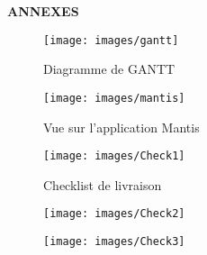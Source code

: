 \newpage
\textbf{ANNEXES}
\newpage

\begin{figure}[!h]
\begin{center}
\texttt{[image: images/gantt]}
\end{center}
\caption{Diagramme de GANTT}
\end{figure}

\begin{figure}[!h]
\begin{center}
\texttt{[image: images/mantis]}
\end{center}
\caption{Vue sur l'application Mantis}
\end{figure}

\begin{figure}[!h]
\begin{center}
\caption{Checklist de livraison}
\texttt{[image: images/Check1]}
\end{center}
\end{figure}

\begin{figure}[!h]
\begin{center}
\texttt{[image: images/Check2]}
\end{center}
\end{figure}

\begin{figure}[!h]
\begin{center}
\texttt{[image: images/Check3]}
\end{center}
\end{figure}


